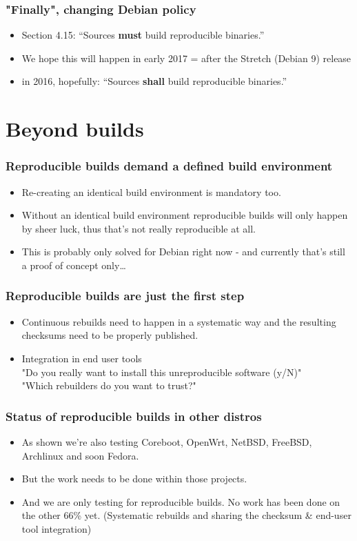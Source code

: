 \documentclass[14pt]{beamer}
\begin{document}
\begin{frame}
 \frametitle{"Finally", changing Debian policy}

 \begin{itemize}
  \item Section 4.15: “Sources \textbf{must} build reproducible binaries.”
  \item<2-3> We hope this will happen in early 2017 = after the Stretch
  (Debian 9) release
  \item<3> in 2016, hopefully: “Sources \textbf{shall} build reproducible binaries.”
 \end{itemize}
\end{frame}

\section{Beyond builds}

\begin{frame}
 \frametitle{Reproducible builds demand a defined build environment}
 \begin{itemize}
  \item Re-creating an identical build environment is mandatory too.
  \item Without an identical build environment reproducible builds will only happen by sheer luck, thus that's not really reproducible at all.
  \item<2>{This is probably only solved for Debian right now - and currently that's still a proof of concept only…}
 \end{itemize}
\end{frame}

\begin{frame}
 \frametitle{Reproducible builds are just the first step}
 \begin{itemize}
  \item Continuous rebuilds need to happen in a systematic way and the resulting checksums need to be properly published.
  \item<2> Integration in end user tools\\
  "Do you really want to install this unreproducible software (y/N)"\\
  "Which rebuilders do you want to trust?"
 \end{itemize}
\end{frame}

\begin{frame}
 \frametitle{Status of reproducible builds in other distros}

 \begin{itemize}
  \item As shown we're also testing Coreboot, OpenWrt, NetBSD, FreeBSD, Archlinux and soon Fedora.
  \item But the work needs to be done within those projects.
  \item<2> And we are only testing for reproducible builds. No work has been done on the other 66\% yet. (Systematic rebuilds and sharing the checksum \& end-user tool integration)
 \end{itemize}
\end{frame}
\end{document}

